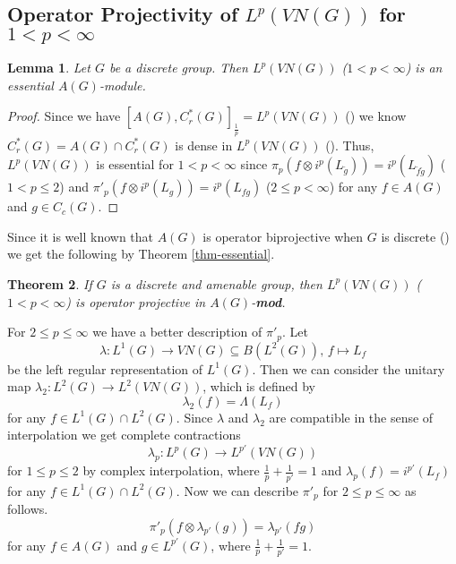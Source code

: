 \documentclass[10pt]{amsart}
\newtheorem{thm}{Theorem}
\newtheorem{lem}[thm]{Lemma}
\numberwithin{thm}{section}
\numberwithin{equation}{section}
\begin{document}
\subsection{Operator Projectivity of $L^p(VN(G))$ for $1<p<\infty$}\label{noncomLp}

	\begin{lem}\label{lem-essential}
	Let $G$ be a discrete group. Then $L^p(VN(G))$ ($1 < p <\infty$) is an essential $A(G)$-module.
	\end{lem}
\begin{proof}
Since we have $[A(G), C^*_r(G)]_{\frac{1}{p}} = L^p(VN(G))$ (\cite[Proposition 3.1]{JR})
we know $C^*_r(G) = A(G) \cap C^*_r(G)$ is dense in $L^p(VN(G))$ (\cite[Theorem 4.2.2]{BL76}).
Thus, $L^p(VN(G))$ is essential for $1 < p < \infty$ since $\pi_p(f \otimes i^p(L_{\check{g}})) = i^p(L_{\check{f} \check{g}})$ ($1< p \le 2$)
and $\pi'_p(f \otimes i^p(L_g)) = i^p(L_{f g})$ ($2\le p <\infty$) for any $f\in A(G)$ and $g\in C_c(G)$.
\end{proof}

Since it is well known that $A(G)$ is operator biprojective when $G$ is discrete (\cite{W02}) we get the following by Theorem \ref{thm-essential}.

	\begin{thm}\label{thm-positive-Lp}
	If $G$ is a discrete and amenable group, then $L^p(VN(G))$ ($1<p<\infty$) is operator projective in $A(G)$-{\bf mod}.
	\end{thm}

For $2\le p\le \infty$ we have a better description of $\pi'_p$. Let
	$$\lambda : L^1(G) \rightarrow VN(G) \subseteq B(L^2(G)),\, f\mapsto L_f$$
be the left regular representation of $L^1(G)$.
Then we can consider the unitary map $\lambda_2 : L^2(G) \rightarrow L^2(VN(G))$, which is defined by
	$$\lambda_2(f) = \Lambda (L_f)$$
for any $f\in L^1(G) \cap L^2(G)$.
Since $\lambda$ and $\lambda_2$ are compatible in the sense of interpolation we get complete contractions
	$$\lambda_p : L^p(G) \rightarrow L^{p'}(VN(G))$$
for $1\le p\le 2$ by complex interpolation,
where $\frac{1}{p} + \frac{1}{p'} = 1$ and $\lambda_p(f) = i^{p'}(L_f)$ for any $f \in L^1(G) \cap L^2(G)$.
Now we can describe $\pi'_p$ for $2\le p \le \infty$ as follows.
	$$\pi'_p(f \otimes \lambda_{p'}(g)) = \lambda_{p'}(f g)$$ for any $f\in A(G)$ and $g\in L^{p'}(G)$, where $\frac{1}{p} + \frac{1}{p'} = 1$.
\end{document}
